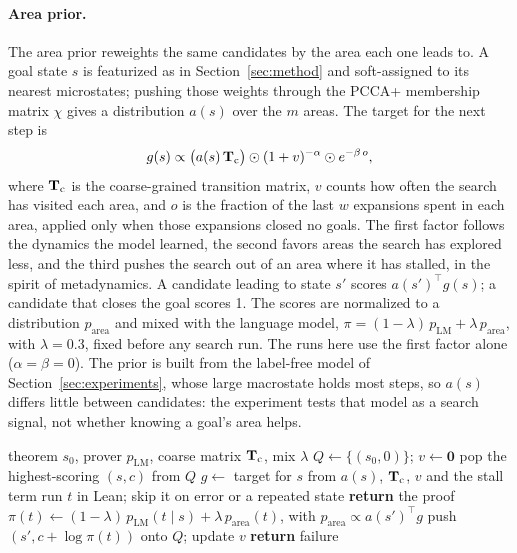 \paragraph{Area prior.}
The area prior reweights the same candidates by the area each one leads to.
A goal state $s$ is featurized as in Section~\ref{sec:method} and
soft-assigned to its nearest microstates; pushing those weights through the
PCCA+ membership matrix $\chi$ gives a distribution $a(s)$ over the $m$
areas. The target for the next step is
\begin{equation}
  g(s) \propto \bigl(a(s)\,\mathbf{T}_{\mathrm{c}}\bigr) \odot (1 + v)^{-\alpha}
  \odot e^{-\beta\,o},
\end{equation}
where $\mathbf{T}_{\mathrm{c}}$ is the coarse-grained transition matrix, $v$ counts
how often the search has visited each area, and $o$ is the fraction of the
last $w$ expansions spent in each area, applied only when those expansions
closed no goals. The first factor follows the dynamics the model learned,
the second favors areas the search has explored less, and the third pushes
the search out of an area where it has stalled, in the spirit of
metadynamics. A candidate leading to state $s'$ scores $a(s')^{\top} g(s)$;
a candidate that closes the goal scores 1. The scores are normalized to a
distribution $p_{\mathrm{area}}$ and mixed with the language model,
$\pi = (1-\lambda)\,p_{\mathrm{LM}} + \lambda\,p_{\mathrm{area}}$, with
$\lambda = 0.3$, fixed before any search run. The runs here use the first
factor alone ($\alpha = \beta = 0$). The prior is built from the label-free
model of Section~\ref{sec:experiments}, whose large macrostate holds most
steps, so $a(s)$ differs little between candidates: the experiment tests
that model as a search signal, not whether knowing a goal's area helps.

\begin{algorithm}[t]
  \caption{Best-first search with the area prior.}
  \label{alg:search}
  \begin{algorithmic}[1]
    \REQUIRE theorem $s_0$, prover $p_{\mathrm{LM}}$, coarse matrix $\mathbf{T}_{\mathrm{c}}$, mix $\lambda$
    \STATE $Q \gets \{(s_0, 0)\}$; $v \gets \mathbf{0}$
      \STATE pop the highest-scoring $(s, c)$ from $Q$
      \STATE $g \gets$ target for $s$ from $a(s)$, $\mathbf{T}_{\mathrm{c}}$, $v$ and the stall term
        \STATE run $t$ in Lean; skip it on error or a repeated state
          \STATE \textbf{return} the proof
        \ENDIF
        \STATE $\pi(t) \gets (1-\lambda)\,p_{\mathrm{LM}}(t \mid s) + \lambda\,p_{\mathrm{area}}(t)$, with $p_{\mathrm{area}} \propto a(s')^{\top} g$
        \STATE push $(s', c + \log \pi(t))$ onto $Q$; update $v$
      \ENDFOR
    \ENDWHILE
    \STATE \textbf{return} failure
  \end{algorithmic}
\end{algorithm}

